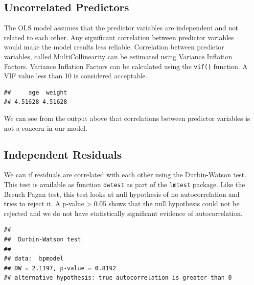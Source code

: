 \documentclass[10pt, letterpaper, twoside]{memoir}\usepackage{knitr}
\begin{document}
\subsection{Uncorrelated Predictors}

The OLS model assumes that the predictor variables are independent and not related to each other. Any significant correlation between predictor variables would make the model results less reliable. Correlation between predictor variables, called MultiCollinearity  can be estimated using Variance Inflation Factors. Variance Inflation Factors can be calculated using the \texttt{vif()}  function. A VIF value less than 10 is considered acceptable.

\begin{knitrout}
\color{fgcolor}\begin{kframe}
\begin{alltt}
\end{alltt}
\begin{verbatim}
##     age  weight 
## 4.51628 4.51628
\end{verbatim}
\end{kframe}
\end{knitrout}

We can see from the output above that correlations between predictor variables is not a concern in our model.

\subsection{Independent Residuals}

We can if residuals are correlated with each other using the Durbin-Watson test. This test is available as function \texttt{dwtest} as part of the \texttt{lmtest} package. Like the Breuch Pagan test, this test looks at null hypothesis of no autocorrelation and tries to reject it. A p-value > 0.05 shows that the null hypothesis could not be rejected and we do not have statistically significant evidence of autocorrelation.

\begin{knitrout}
\color{fgcolor}\begin{kframe}
\begin{alltt}
\end{alltt}
\begin{verbatim}
## 
## 	Durbin-Watson test
## 
## data:  bpmodel
## DW = 2.1197, p-value = 0.8192
## alternative hypothesis: true autocorrelation is greater than 0
\end{verbatim}
\end{kframe}
\end{knitrout}
\end{document}
